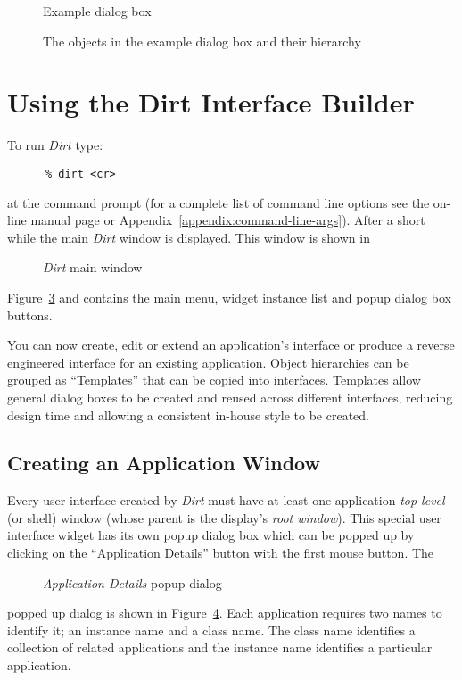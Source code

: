 \begin{figure}
\centerline{}
\caption{Example dialog box}
\label{fig:example}
\end{figure}

\begin{figure}
\centerline{
\hspace{.75in}
}
\caption{The objects in the example dialog box and their hierarchy}
\label{fig:example-hierarchy}
\end{figure}

\section{Using the Dirt Interface Builder}
To run {\em Dirt} type:
\begin{verbatim}
      % dirt <cr>
\end{verbatim}
at the command prompt (for a complete list of command line options see the
on-line manual page or Appendix~\ref{appendix:command-line-args}).
After a short
while the main {\em Dirt} window is displayed.  This window is shown in
\begin{figure}
\centerline{}
\caption{{\em Dirt} main window}
\label{fig:main-window}
\end{figure}
Figure~\ref{fig:main-window} and contains the main menu,
widget instance list and popup dialog box buttons.

You can now create, edit or extend an application's interface or produce a
reverse engineered interface for an existing application.  Object hierarchies
can be grouped as ``Templates'' that can be copied into
interfaces.  Templates allow general dialog boxes to be created and reused
across different interfaces, reducing design time and allowing a
consistent in-house style to be created.

\subsection{Creating an Application Window}
\label{sec:creating-app}
Every user interface created by {\em Dirt} must have at least one application
{\em top level} (or shell) window (whose parent is the display's {\em root
window}).  This special user interface widget has its own popup dialog box
which can be popped up by clicking on the ``Application Details'' button
with the first mouse button.  The\begin{figure}
\centerline{}
\caption{{\em Application Details} popup dialog}
\label{fig:app-dialog-box}
\end{figure}
popped up dialog is shown in Figure~\ref{fig:app-dialog-box}.  Each
application requires two names to identify it; an instance name and a class
name.  The class name identifies a collection of related applications and the
instance name identifies a particular application.

